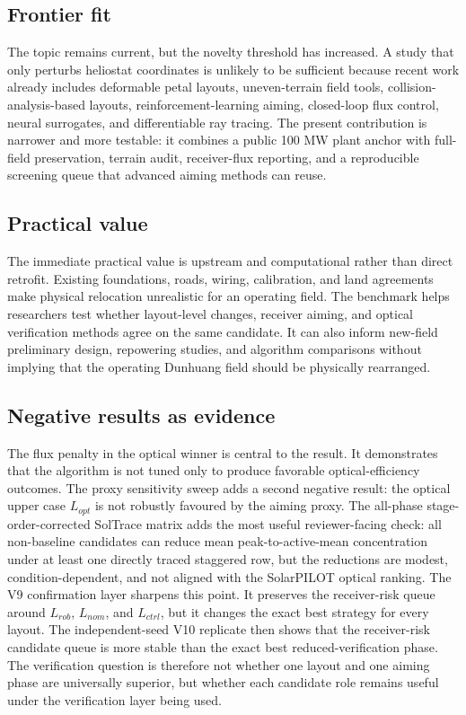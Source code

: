 \documentclass[final,3p,times]{elsarticle}
\begin{document}
\subsection{Frontier fit}
The topic remains current, but the novelty threshold has increased. A study that only perturbs heliostat coordinates is unlikely to be sufficient because recent work already includes deformable petal layouts, uneven-terrain field tools, collision-analysis-based layouts, reinforcement-learning aiming, closed-loop flux control, neural surrogates, and differentiable ray tracing. The present contribution is narrower and more testable: it combines a public 100 MW plant anchor with full-field preservation, terrain audit, receiver-flux reporting, and a reproducible screening queue that advanced aiming methods can reuse.

\subsection{Practical value}
The immediate practical value is upstream and computational rather than direct retrofit. Existing foundations, roads, wiring, calibration, and land agreements make physical relocation unrealistic for an operating field. The benchmark helps researchers test whether layout-level changes, receiver aiming, and optical verification methods agree on the same candidate. It can also inform new-field preliminary design, repowering studies, and algorithm comparisons without implying that the operating Dunhuang field should be physically rearranged.

\subsection{Negative results as evidence}
The flux penalty in the optical winner is central to the result. It demonstrates that the algorithm is not tuned only to produce favorable optical-efficiency outcomes. The proxy sensitivity sweep adds a second negative result: the optical upper case $L_{opt}$ is not robustly favoured by the aiming proxy. The all-phase stage-order-corrected SolTrace matrix adds the most useful reviewer-facing check: all non-baseline candidates can reduce mean peak-to-active-mean concentration under at least one directly traced staggered row, but the reductions are modest, condition-dependent, and not aligned with the SolarPILOT optical ranking. The V9 confirmation layer sharpens this point. It preserves the receiver-risk queue around $L_{rob}$, $L_{nom}$, and $L_{ctrl}$, but it changes the exact best strategy for every layout. The independent-seed V10 replicate then shows that the receiver-risk candidate queue is more stable than the exact best reduced-verification phase. The verification question is therefore not whether one layout and one aiming phase are universally superior, but whether each candidate role remains useful under the verification layer being used.
\end{document}
